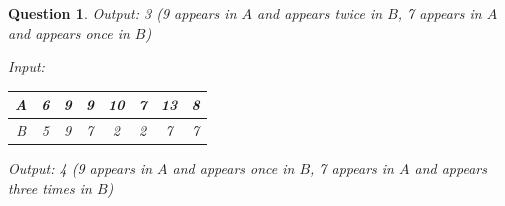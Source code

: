 \documentclass[a4paper]{article}
\theoremstyle{remarksStyle}
\theoremstyle{questionStyle}
\newtheorem{question}{Question}
\theoremstyle{answerStyle}
\begin{document}
\begin{question}
\vspace{0.5cm}
Output:  3 \hspace{1cm} (\textit{9 appears in $A$ and appears twice in $B$,  7 appears in $A$  and appears once in $B$})


\vspace{1cm}
Input:
\begin{tabular}{|c || c | c  | c | c | c | c | c ||} 
 \hline
 A & 6 & 9 & 9 & 10 & 7 & 13 & 8  \\ 
 \hline
 B & 5 & 9 & 7 & 2 & 2 & 7 & 7  \\ 
 \hline
\end{tabular}

\vspace{0.5cm}
Output:  4 \hspace{1cm} (\textit{9 appears in $A$ and appears once in $B$,  7 appears in $A$  and appears three times in $B$})










\end{question}

\vspace{0.5 cm}
\end{document}
